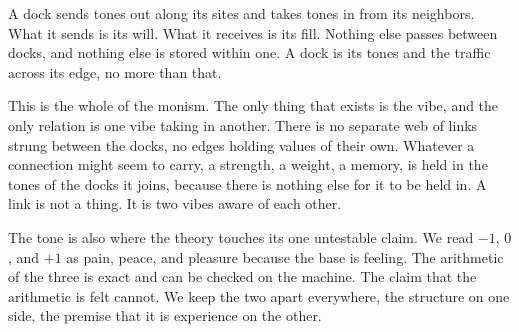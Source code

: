 A dock sends tones out along its sites and takes tones in from its neighbors. What it sends is its will. What it receives is its fill. Nothing else passes between docks, and nothing else is stored within one. A dock is its tones and the traffic across its edge, no more than that.

This is the whole of the monism. The only thing that exists is the vibe, and the only relation is one vibe taking in another. There is no separate web of links strung between the docks, no edges holding values of their own. Whatever a connection might seem to carry, a strength, a weight, a memory, is held in the tones of the docks it joins, because there is nothing else for it to be held in. A link is not a thing. It is two vibes aware of each other.

The tone is also where the theory touches its one untestable claim. We read $-1$, $0$, and $+1$ as pain, peace, and pleasure because the base is feeling. The arithmetic of the three is exact and can be checked on the machine. The claim that the arithmetic is felt cannot. We keep the two apart everywhere, the structure on one side, the premise that it is experience on the other.
